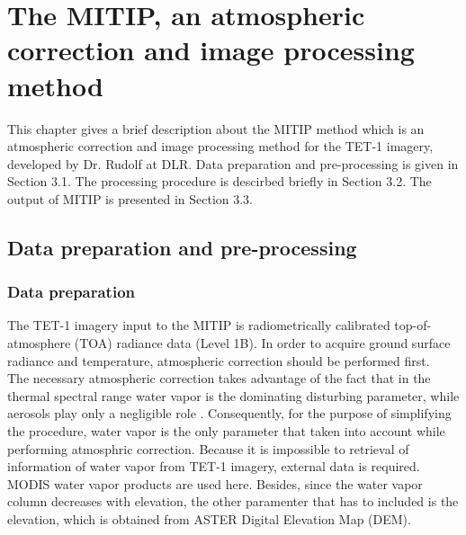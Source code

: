 \chapter{The MITIP, an atmospheric correction and image processing method}

\label{Chapter3}

This chapter gives a brief description about the MITIP method which is an atmospheric correction and image processing method for the TET-1 imagery, developed by Dr. Rudolf at DLR. Data preparation and pre-processing is given in Section 3.1. The processing procedure is descirbed briefly in Section 3.2. The output of MITIP is presented in Section 3.3.\\


\section{Data preparation and pre-processing}


\subsection{Data preparation}
The TET-1 imagery input to the MITIP is radiometrically calibrated top-of-atmosphere (TOA) radiance data (Level 1B). In order to acquire ground surface radiance and temperature, atmospheric correction should be performed first.\\

\noindent The necessary atmospheric correction takes advantage of the fact that in the thermal spectral range water vapor is the dominating disturbing parameter, while aerosols play only a negligible role \parencite{Reference204}. Consequently, for the purpose of simplifying the procedure, water vapor is the only parameter that taken into account while performing atmosphric correction. Because it is impossible to retrieval of information of water vapor from TET-1 imagery, external data is required. MODIS water vapor products are used here. Besides, since the water vapor column decreases with elevation, the other paramenter that has to included is the elevation, which is obtained from ASTER Digital Elevation Map (DEM).\\

